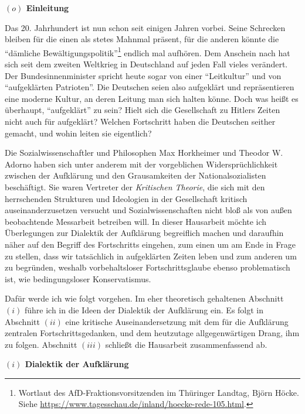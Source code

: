 \documentclass[a4paper, 12pt]{article}
\begin{document}
\begin{onehalfspace} 

\noindent\textbf{$(o)$ Einleitung}

\noindent Das 20. Jahrhundert ist nun schon seit einigen Jahren vorbei. Seine Schrecken bleiben für die einen als stetes Mahnmal präsent, für die anderen könnte die "`dämliche Bewälti\-gungs\-politik"'\footnote{Wortlaut des AfD-Fraktionsvorsitzenden im Thüringer Landtag, Björn Höcke. Siehe \url{https://www.tagesschau.de/inland/hoecke-rede-105.html}.} endlich mal aufhören. Dem Anschein nach hat sich seit dem zweiten Weltkrieg in Deutschland auf jeden Fall vieles verändert. Der Bundesinnenminister spricht heute sogar von einer "`Leitkultur"' und von "`aufgeklärten Patrioten"'. Die Deutschen seien also aufgeklärt und repräsentieren eine moderne Kultur, an deren Leitung man sich halten könne. Doch was heißt es überhaupt, "`aufgeklärt"' zu sein? Hielt sich die Gesellschaft zu Hitlers Zeiten nicht auch für aufgeklärt? Welchen Fortschritt haben die Deutschen seither gemacht, und wohin leiten sie eigentlich? 

Die Sozialwissenschaftler und Philosophen Max Horkheimer und Theodor W. Adorno haben sich unter anderem mit der vorgeblichen Widersprüchlichkeit zwischen der Aufklärung und den Grausamkeiten der Nationalsozialisten beschäftigt. Sie waren Vertreter der \emph{Kritischen Theorie}, die sich mit den herrschenden Strukturen und Ideologien in der Gesellschaft kritisch auseinanderzusetzen versucht und Sozialwissenschaften nicht bloß als von außen beobachtende Messarbeit betreiben will. In dieser Hausarbeit möchte ich Überlegungen zur Dialektik der Aufklärung begreiflich machen und daraufhin näher auf den Begriff des Fortschritts eingehen, zum einen um am Ende in Frage zu stellen, dass wir tatsächlich in aufgeklärten Zeiten leben und zum anderen um zu begründen, weshalb vorbehaltsloser Fortschrittsglaube ebenso problematisch ist, wie bedingungsloser Konservatismus.

Dafür werde ich wie folgt vorgehen. Im eher theoretisch gehaltenen Abschnitt $(i)$ führe ich in die Ideen der Dialektik der Aufklärung ein. Es folgt in Abschnitt $(ii)$ eine kritische Auseinandersetzung mit dem für die Aufklärung zentralen Fortschrittsgedanken, und dem heutzutage allgegenwärtigen Drang, ihm zu folgen. Abschnitt $(iii)$ schließt die Hausarbeit zusammenfassend ab.

\vspace{5mm}


\noindent\textbf{$(i)$ Dialektik der Aufklärung}


\end{onehalfspace}
\end{document}
